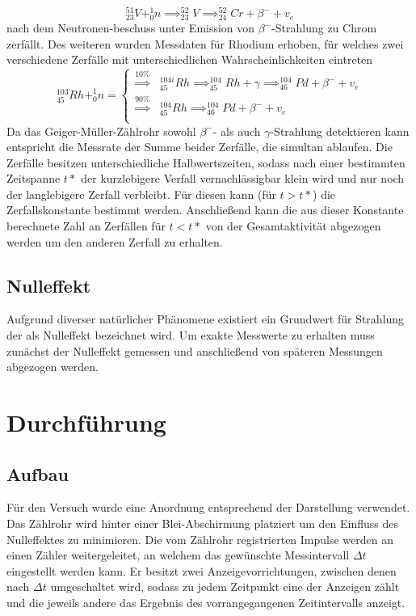 \documentclass{scrartcl}
\begin{document}
\begin{equation}
^{51}_{23}V + ^1_0n \implies ^{52}_{23}V \implies ^{52}_{24}Cr + \beta^- + v_e
\end{equation}
nach dem Neutronen-beschuss unter Emission von $\beta^-$-Strahlung zu Chrom zerfällt. Des weiteren wurden Messdaten für Rhodium erhoben, für welches zwei verschiedene Zerfälle mit unterschiedlichen Wahrscheinlichkeiten eintreten
\begin{equation*}
^{103}_{45}Rh+^1_0n=
\begin{cases}
{\stackrel{10\%}{\implies}} &^{104i}_{45}Rh \implies ^{104}_{45}Rh+ \gamma \implies ^{104}_{46}Pd+\beta^-+v_e \\
{\stackrel{90\%}{\implies}} &^{104}_{45}Rh \implies ^{104}_{46}Pd+\beta^-+v_e \\
\end{cases}
\end{equation*}
Da das Geiger-Müller-Zählrohr sowohl $\beta^-$- als auch $\gamma$-Strahlung detektieren kann entspricht die Messrate der Summe beider Zerfälle, die simultan ablaufen. Die Zerfälle besitzen unterschiedliche Halbwertszeiten, sodass nach einer bestimmten Zeitspanne $t*$ der kurzlebigere Verfall vernachlässigbar klein wird und nur noch der langlebigere Zerfall verbleibt. Für diesen kann (für $t>t*$) die Zerfallskonstante bestimmt werden. Anschließend kann die aus dieser Konstante berechnete Zahl an Zerfällen für $t<t*$ von der Gesamtaktivität abgezogen werden um den anderen Zerfall zu erhalten.
\subsection{Nulleffekt}
Aufgrund diverser natürlicher Phänomene existiert ein Grundwert für Strahlung der als Nulleffekt bezeichnet wird. Um exakte Messwerte zu erhalten muss zunächst der Nulleffekt gemessen und anschließend von späteren Messungen abgezogen werden.
\section{Durchführung}
\subsection{Aufbau}
Für den Versuch wurde eine Anordnung entsprechend der Darstellung verwendet. Das Zählrohr wird hinter einer Blei-Abschirmung platziert um den Einfluss des Nulleffektes zu minimieren. Die vom Zählrohr registrierten Impulse werden an einen Zähler weitergeleitet, an welchem das gewünschte Messintervall $\Delta t$ eingestellt werden kann. Er besitzt zwei Anzeigevorrichtungen, zwischen denen nach $\Delta t$ umgeschaltet wird, sodass zu jedem Zeitpunkt eine der Anzeigen zählt und die jeweils andere das Ergebnis des vorrangegangenen Zeitintervalls anzeigt.
\end{document}
